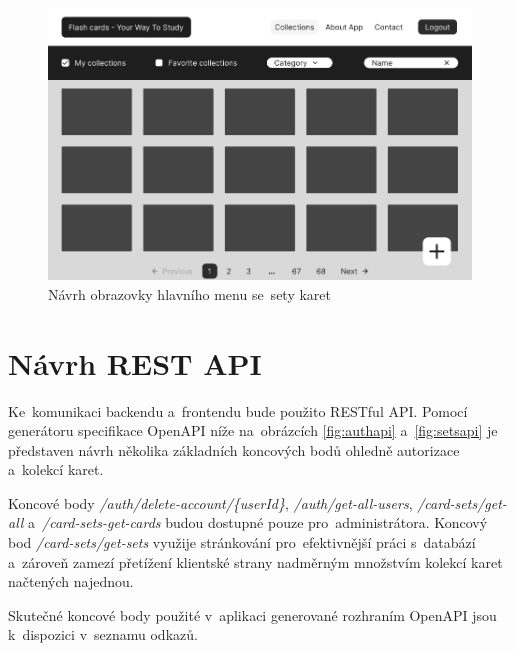 \documentclass[twoside]{ctuthesis}
\begin{document}
\begin{figure}[H]
\centering
\includegraphics[width=1.1\textwidth, height=0.36\textheight]{MainMenu.png}
\caption{Návrh obrazovky hlavního menu se~sety karet}
\label{fig:sets}
\end{figure}

\newpage

\section{Návrh REST API}

Ke~komunikaci backendu a~frontendu bude použito RESTful API. Pomocí generátoru specifikace OpenAPI níže na~obrázcích \ref{fig:authapi} a~\ref{fig:setsapi} je představen návrh několika základních koncových bodů ohledně autorizace a~kolekcí karet.

Koncové body \emph{/auth/delete-account/\{userId\}}, \emph{/auth/get-all-users}, \emph{/card-sets/get-all} a~\emph{/card-sets-get-cards} budou dostupné pouze pro~administrátora. Koncový bod \emph{/card-sets/get-sets} využije stránkování pro~efektivnější práci s~databází a~zároveň zamezí přetížení klientské strany nadměrným množstvím kolekcí karet načtených najednou.

Skutečné koncové body použité v~aplikaci generované rozhraním OpenAPI jsou k~dispozici v~seznamu odkazů.
\end{document}

